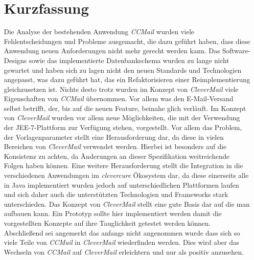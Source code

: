 \chapter{Kurzfassung}
Die Analyse der bestehenden Anwendung \emph{CCMail} wurden viele Fehlentscheidungen und Probleme ausgemacht, die dazu geführt haben, dass diese Anwendung neuen Anforderungen nicht mehr gerecht werden kann. Das Software-Designs sowie das implementierte Datenbankschema wurden zu lange nicht gewartet und haben sich zu lagen nicht den neuen Standards und Technologien angepasst, was dazu geführt hat, das ein Refaktorisieren einer Reimplementierung gleichzusetzen ist. Nichts desto trotz wurden im Konzept von \emph{CleverMail} viele Eigenschaften von \emph{CCMail} übernommen. Vor allem was den E-Mail-Versand selbst betrifft, der, bis auf die neuen Feature, beinahe glich verläuft. Im Konzept von \emph{CleverMail} wurden vor allem neue Möglichkeiten, die mit der Verwendung der JEE-7-Plattform zur Verfügung stehen, vorgestellt. Vor allem das Problem, der Vorlagenparameter stellt eine Herausforderung dar, da diese in vielen Bereichen von \emph{CleverMail} verwendet werden. Hierbei ist besonders auf die Konsistenz zu achten, da Änderungen an dieser Spezifikation weitreichende Folgen haben können. 
\newline
\newline
Eine weitere Herausforderung stellt die Integration in die verschiedenen Anwendungen im \emph{clevercure} Ökosystem dar, da diese einerseits alle in Java implementiert wurden jedoch auf unterschiedlichen Plattformen laufen und sich daher auch die unterstützten Technologien und Frameworks stark unterschieden. Das Konzept von \emph{CleverMail} stellt eine gute Basis dar auf die man aufbauen kann. Ein Prototyp sollte hier implementiert werden damit die vorgestellten Konzepte auf ihre Tauglichkeit getestet werden können. Abschließend sei angemerkt das anfangs nicht angenommen wurde dass sich so viele Teile von \emph{CCMail} in \emph{CleverMail} wiederfinden werden. Dies wird aber das Wechseln von \emph{CCMail} auf \emph{CleverMail} erleichtern und nur als positiv anzusehen.